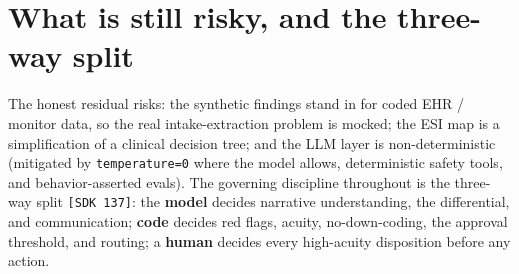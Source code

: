 \documentclass[11pt]{article}
\newcommand{\code}[1]{\texttt{#1}}
\begin{document}
\section{What is still risky, and the three-way split}
The honest residual risks: the synthetic findings stand in for coded EHR / monitor data, so the
real intake-extraction problem is mocked; the ESI map is a simplification of a clinical decision
tree; and the LLM layer is non-deterministic (mitigated by \code{temperature=0} where the model
allows, deterministic safety tools, and behavior-asserted evals). The governing discipline
throughout is the three-way split \code{[SDK 137]}: the \textbf{model} decides narrative
understanding, the differential, and communication; \textbf{code} decides red flags, acuity,
no-down-coding, the approval threshold, and routing; a \textbf{human} decides every high-acuity
disposition before any action.
\end{document}
